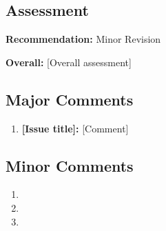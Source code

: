 \documentclass[11pt, a4paper]{article}
\begin{document}
\subsection*{Assessment}
\textbf{Recommendation:} \textcolor{green!60!black}{Minor Revision}

\textbf{Overall:} [Overall assessment]

\subsection*{Major Comments}
\begin{enumerate}[leftmargin=*, label=\textbf{M\arabic*.}]
  \item \textbf{[Issue title]:} [Comment]
\end{enumerate}

\subsection*{Minor Comments}
\begin{enumerate}[leftmargin=*, label=\textbf{m\arabic*.}]
  \item [Minor comment]
  \item [Minor comment]
  \item [Minor comment]
\end{enumerate}
\end{document}
